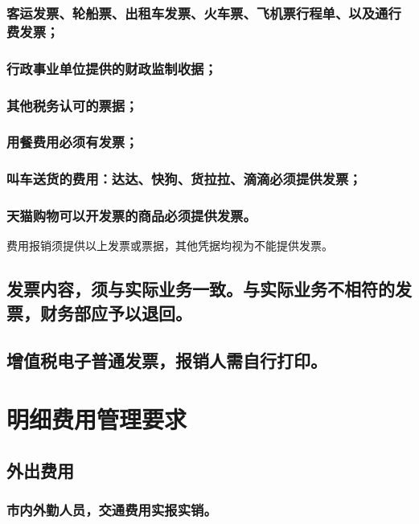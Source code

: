 \documentclass[16pt]{article}
\begin{document}
\subsubsection{客运发票、轮船票、出租车发票、火车票、飞机票行程单、以及通行费发票；}
\subsubsection{行政事业单位提供的财政监制收据；}
\subsubsection{其他税务认可的票据；}
\subsubsection{用餐费用必须有发票；}
\subsubsection{叫车送货的费用：达达、快狗、货拉拉、滴滴必须提供发票；}
\subsubsection{天猫购物可以开发票的商品必须提供发票。}
费用报销须提供以上发票或票据，其他凭据均视为不能提供发票。
\subsection{发票内容，须与实际业务一致。与实际业务不相符的发票，财务部应予以退回。}
\subsection{增值税电子普通发票，报销人需自行打印。}


\section{明细费用管理要求}
\subsection{外出费用}
\subsubsection{市内外勤人员，交通费用实报实销。}
\end{document}
